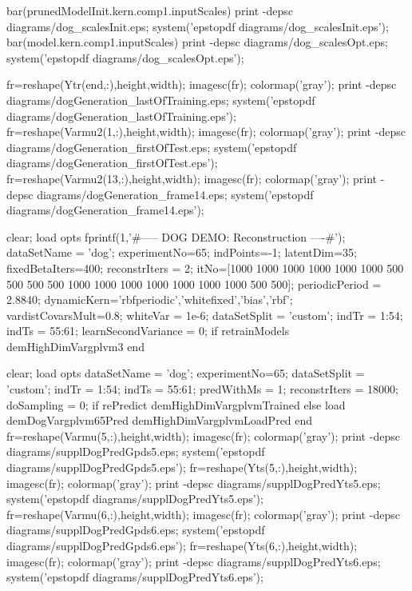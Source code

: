 \documentclass{article} %
\newenvironment{matlab}{\comment}{\endcomment}
\begin{document}
\begin{matlab}
bar(prunedModelInit.kern.comp{1}.inputScales)
print -depsc diagrams/dog_scalesInit.eps; system('epstopdf diagrams/dog_scalesInit.eps');
bar(model.kern.comp{1}.inputScales)
print -depsc diagrams/dog_scalesOpt.eps; system('epstopdf diagrams/dog_scalesOpt.eps');

fr=reshape(Ytr(end,:),height,width); imagesc(fr); colormap('gray'); %
print -depsc diagrams/dogGeneration_lastOfTraining.eps; system('epstopdf diagrams/dogGeneration_lastOfTraining.eps');
fr=reshape(Varmu2(1,:),height,width); imagesc(fr); colormap('gray');  %
print -depsc diagrams/dogGeneration_firstOfTest.eps; system('epstopdf diagrams/dogGeneration_firstOfTest.eps');
fr=reshape(Varmu2(13,:),height,width); imagesc(fr); colormap('gray'); %
print -depsc diagrams/dogGeneration_frame14.eps; system('epstopdf diagrams/dogGeneration_frame14.eps');




clear; load opts
fprintf(1,'\n\n#-----  DOG DEMO: Reconstruction ----#\n');
dataSetName = 'dog';
experimentNo=65;
indPoints=-1; latentDim=35;
fixedBetaIters=400;
reconstrIters = 2;
itNo=[1000 1000 1000 1000 1000 1000 500 500 500 500 1000 1000 1000 1000 1000 1000 1000 500 500]; %
periodicPeriod = 2.8840;
dynamicKern={'rbfperiodic','whitefixed','bias','rbf'};
vardistCovarsMult=0.8;
whiteVar = 1e-6;
dataSetSplit = 'custom';
indTr = 1:54;
indTs = 55:61;
learnSecondVariance = 0;
if retrainModels
    demHighDimVargplvm3
end


clear; load opts
dataSetName = 'dog';
experimentNo=65;
dataSetSplit = 'custom';
indTr = 1:54; indTs = 55:61;
predWithMs = 1; %
reconstrIters = 18000; 
doSampling = 0;
if rePredict
    demHighDimVargplvmTrained
else
    load demDogVargplvm65Pred
    demHighDimVargplvmLoadPred
end
fr=reshape(Varmu(5,:),height,width); imagesc(fr); colormap('gray'); 
print -depsc diagrams/supplDogPredGpds5.eps; system('epstopdf diagrams/supplDogPredGpds5.eps');
fr=reshape(Yts(5,:),height,width); imagesc(fr); colormap('gray'); 
print -depsc diagrams/supplDogPredYts5.eps; system('epstopdf diagrams/supplDogPredYts5.eps');
fr=reshape(Varmu(6,:),height,width); imagesc(fr); colormap('gray'); 
print -depsc diagrams/supplDogPredGpds6.eps; system('epstopdf diagrams/supplDogPredGpds6.eps');
fr=reshape(Yts(6,:),height,width); imagesc(fr); colormap('gray'); 
print -depsc diagrams/supplDogPredYts6.eps; system('epstopdf diagrams/supplDogPredYts6.eps');


\end{matlab}
\end{document}
